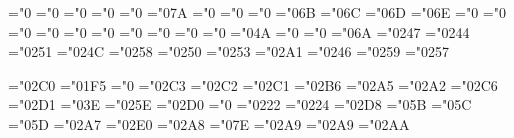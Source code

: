 \mathchardef\alpha="0
\mathchardef\beta="0
\mathchardef\gamma="0
\mathchardef\delta="0
\mathchardef\epsilon="0
\mathchardef\zeta="0\ms@7A
\mathchardef\eta="0
\mathchardef\theta="0
\mathchardef\iota="0
\mathchardef\kappa="0\ms@6B
\mathchardef\lambda="0\ms@6C
\mathchardef\mu="0\ms@6D
\mathchardef\nu="0\ms@6E
\mathchardef\xi="0
\mathchardef\pi="0
\mathchardef\rho="0
\mathchardef\sigma="0
\mathchardef\tau="0
\mathchardef\upsilon="0
\mathchardef\phi="0
\mathchardef\chi="0
\mathchardef\psi="0
\mathchardef\omega="0
\def\varepsilon{\@PSsub\varepsilon\epsilon}
\mathchardef\vartheta="0\ms@4A
\mathchardef\varpi="0
\def\varrho{\@PSsub\varrho\rho}
\mathchardef\varsigma="0
\mathchardef\varphi="0\ms@6A
\mathchardef\Gamma="0247
\mathchardef\Delta="0244
\mathchardef\Theta="0251
\mathchardef\Lambda="024C
\mathchardef\Xi="0258
\mathchardef\Pi="0250
\mathchardef\Sigma="0253
\mathchardef\Upsilon="02A1
\mathchardef\Phi="0246
\mathchardef\Psi="0259
\mathchardef\Omega="0257

\mathchardef\aleph="02C0
\def\hbar{{\mathchar"00C5\mkern-8muh}}
\mathchardef\imath="01F5
\def\jmath{\@PSsub\jmath{j}}
\if@usecmmi
 \mathchardef\ell="0
\else
 \def\ell{\@PSsub\ell{l}}
\fi
\mathchardef\wp="02C3
\mathchardef\Re="02C2
\mathchardef\Im="02C1
\mathchardef\partial="02B6
\mathchardef\infty="02A5
\mathchardef\@prime="02A2
\def\prime{\@prime\@warning{\string\prime\space produces a small prime in PS-LaTeX}}
\mathchardef\emptyset="02C6
\mathchardef\nabla="02D1
\def\surd{{\mathchar"12D6}}
\if@usecmsy
 \mathchardef\top="0\cmsy@3E
\else
 \def\top{\@PSnofont\top}
\fi
\mathchardef\bot="025E
\mathchardef\angle="02D0
\if@usecmsy
 \mathchardef\triangle="0
\else
 \def\triangle{\@PSnofont\triangle}
\fi
\mathchardef\forall="0222
\mathchardef\exists="0224
\mathchardef\neg="02D8 \let\lnot=\neg
\if@usecmmi
 \mathchardef\flat="0\cmmi@5B
 \mathchardef\natural="0\cmmi@5C
 \mathchardef\sharp="0\cmmi@5D
\else
 \def\flat{\@PSnofont\flat}
 \def\natural{\@PSnofont\natural}
 \def\sharp{\@PSnofont\sharp}
\fi
\mathchardef\clubsuit="02A7
\mathchardef\diamondsuit="02E0
\mathchardef\fulldiamondsuit="02A8 %
\if@usecmsy
 \mathchardef\heartsuit="0\cmsy@7E
 \mathchardef\fullheartsuit="02A9 %
\else
 \mathchardef\heartsuit="02A9 %
\fi
\mathchardef\spadesuit="02AA

